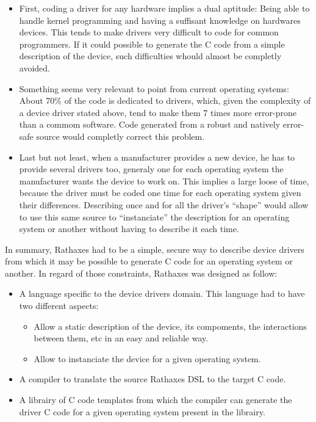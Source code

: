 \documentclass[a4paper,11pt]{report}
\begin{document}
  \begin{itemize}
    \item First, coding a driver for any hardware implies a dual aptitude: Being
     able to handle kernel programming and having a suffisant knowledge on
     hardwares devices. This tends to make drivers very difficult to code for
     common programmers. If it could possible to generate the C code from a
     simple description of the device, such difficulties whould almost be
     completly avoided.
    \item Something seems very relevant to point from current operating systems:
    About 70\% of the code is dedicated to drivers, which, given the complexity
    of a device driver stated above, tend to make them 7 times more error-prone
    than a commom software. Code generated from a robust and natively error-safe
    source would completly correct this problem.
    \item Last but not least, when a manufacturer provides a new device, he has
    to provide several drivers too, generaly one for each operating system the
    manufacturer wants the device to work on. This implies a large loose of time,
    because the driver must be coded one time for each operating system given
    their differences. Describing once and for all the driver's ``shape'' would
    allow to use this same source to ``instanciate'' the description for an
    operating system or another without having to describe it each time.
  \end{itemize}

  In summary, Rathaxes had to be a simple, secure way to describe device drivers
  from which it may be possible to generate C code for an operating system or
  another. In regard of those constraints, Rathaxes was designed as follow:

  \begin{itemize}
    \item A language specific to the device drivers domain. This language had
    to have two different aspects:
      \begin{itemize}
        \item Allow a static description of the device, its compoments, the
	interactions between them, etc in an easy and reliable way.
	\item Allow to instanciate the device for a given operating system.
      \end{itemize}
    \item A compiler to translate the source Rathaxes DSL to the target C code.
    \item A librairy of C code templates from which the compiler can generate
    the driver C code for a given operating system present in the librairy.
  \end{itemize}
\end{document}
